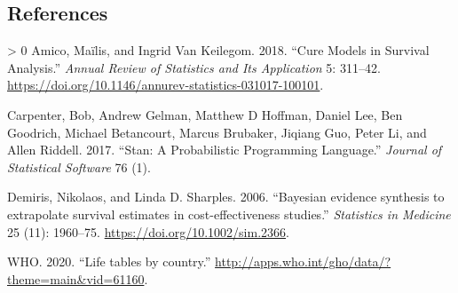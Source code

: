 \documentclass[
]{article}
\newlength{\cslhangindent}
\newenvironment{CSLReferences}[3] %
 {%
  \setlength{\parindent}{0pt}
  \ifodd #1 \everypar{\setlength{\hangindent}{\cslhangindent}}\ignorespaces\fi
  \ifnum #2 > 0
  \setlength{\parskip}{#2\baselineskip}
  \fi
 }%
 {}
\begin{document}
\hypertarget{references}{%
\subsection*{References}\label{references}}

\hypertarget{refs}{}
\begin{CSLReferences}{1}{0}
\leavevmode\hypertarget{ref-Amico2018}{}%
Amico, Maïlis, and Ingrid Van Keilegom. 2018. {``{Cure Models in
Survival Analysis}.''} \emph{Annual Review of Statistics and Its
Application} 5: 311--42.
\url{https://doi.org/10.1146/annurev-statistics-031017-100101}.

\leavevmode\hypertarget{ref-carpenter2017stan}{}%
Carpenter, Bob, Andrew Gelman, Matthew D Hoffman, Daniel Lee, Ben
Goodrich, Michael Betancourt, Marcus Brubaker, Jiqiang Guo, Peter Li,
and Allen Riddell. 2017. {``Stan: A Probabilistic Programming
Language.''} \emph{Journal of Statistical Software} 76 (1).

\leavevmode\hypertarget{ref-Demiris2006}{}%
Demiris, Nikolaos, and Linda D. Sharples. 2006. {``{Bayesian evidence
synthesis to extrapolate survival estimates in cost-effectiveness
studies}.''} \emph{Statistics in Medicine} 25 (11): 1960--75.
\url{https://doi.org/10.1002/sim.2366}.

\leavevmode\hypertarget{ref-wholifetables}{}%
WHO. 2020. {``{Life tables by country}.''}
\url{http://apps.who.int/gho/data/?theme=main\&vid=61160}.

\end{CSLReferences}
\end{document}
